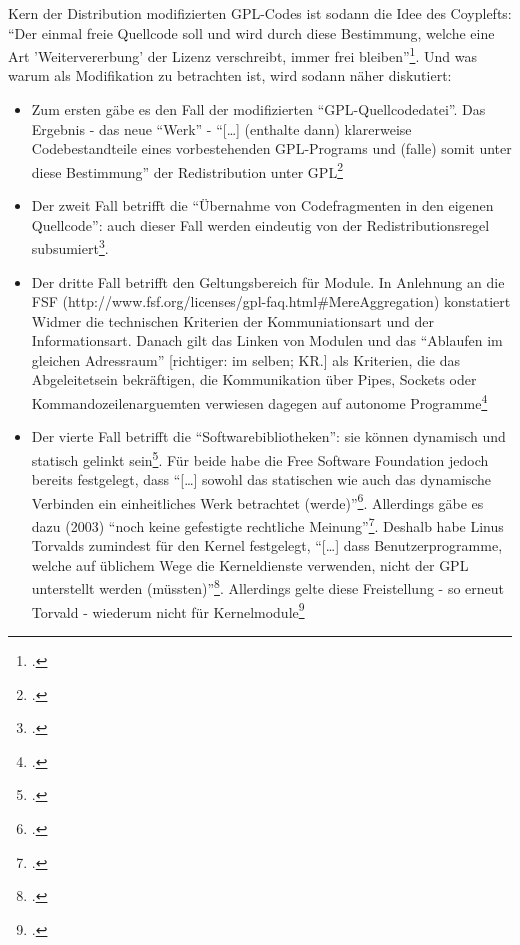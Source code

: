 \documentclass[DIV=calc,BCOR=5mm,11pt,headings=small,oneside,abstract=true, toc=bib]{scrartcl}
\begin{document}
Kern der Distribution modifizierten GPL-Codes ist sodann die Idee des Coyplefts:
\enquote{Der einmal freie Quellcode soll und wird durch diese Bestimmung,
welche eine Art 'Weitervererbung' der Lizenz verschreibt, immer frei
bleiben}\footcite[][137f]{Widmer2003a}. Und was warum als Modifikation
zu betrachten ist, wird sodann näher diskutiert:
\begin{itemize}
  \item Zum ersten gäbe es den Fall der modifizierten
  \enquote{GPL-Quellcodedatei}. Das Ergebnis - das neue \enquote{Werk} -
  \enquote{[\ldots] (enthalte dann) klarerweise Codebestandteile eines
  vorbestehenden GPL-Programs und (falle) somit unter diese Bestimmung}
  der Redistribution unter GPL\footcite[][138]{Widmer2003a}
  \item Der zweit Fall betrifft die \enquote{Übernahme von Codefragmenten
  in den eigenen Quellcode}: auch dieser Fall werden eindeutig von der
  Redistributionsregel subsumiert\footcite[][138]{Widmer2003a}.
  \item Der dritte Fall betrifft den Geltungsbereich für Module. In Anlehnung an
  die FSF (http://www.fsf.org/licenses/gpl-faq.html\#MereAggregation)
  konstatiert Widmer die technischen Kriterien der Kommuniationsart und der Informationsart.
  Danach gilt das Linken von Modulen und das \enquote{Ablaufen im gleichen
  Adressraum} [richtiger: im selben; KR.] als Kriterien, die das
  Abgeleitetsein bekräftigen, die Kommunikation über Pipes, Sockets oder
  Kommandozeilenarguemten verwiesen dagegen auf autonome
  Programme\footcite[][139f]{Widmer2003a}
  \item Der vierte Fall betrifft die \enquote{Softwarebibliotheken}: sie
  können dynamisch und statisch gelinkt sein\footcite[][141]{Widmer2003a}. Für
  beide habe die Free Software Foundation jedoch bereits festgelegt, dass
  \enquote{[\ldots] sowohl das statischen wie auch das dynamische Verbinden
  ein einheitliches Werk betrachtet (werde)}\footcite[][142
  Belegt wird das durch den Rückgriff auf die LGPL-Lizenz, die
  genau dieses in Abs. 10 der Präambel so festlege]{Widmer2003a}. Allerdings
  gäbe es dazu (2003) \enquote{noch keine gefestigte rechtliche
  Meinung}\footcite[][142]{Widmer2003a}. Deshalb habe Linus Torvalds
  zumindest für den Kernel festgelegt, \enquote{[\ldots] dass
  Benutzerprogramme, welche auf üblichem Wege die Kerneldienste
  verwenden, nicht der GPL unterstellt werden
  (müssten)}\footcite[][142 Original unter DiBona Torvalds
  Kernelmodule.]{Widmer2003a}. Allerdings gelte diese Freistellung - so
  erneut Torvald - wiederum nicht für Kernelmodule\footcite[][142
  Original
  http://www.uwsg.iu.edu/hypermail/linux/kernel/2010.2/0603.html]{Widmer2003a}
\end{itemize}
\end{document}
